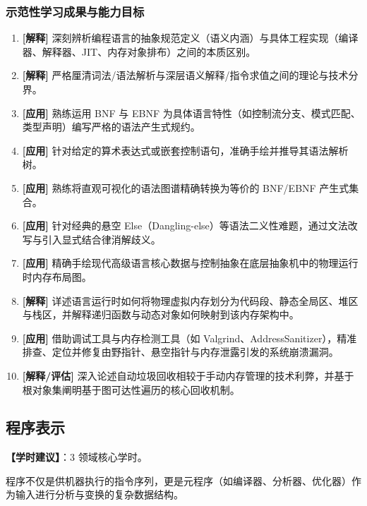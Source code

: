 \subsubsection{示范性学习成果与能力目标}
\begin{enumerate}
    \item \textbf{[解释]} 深刻辨析编程语言的抽象规范定义（语义内涵）与具体工程实现（编译器、解释器、JIT、内存对象排布）之间的本质区别。
    \item \textbf{[解释]} 严格厘清词法/语法解析与深层语义解释/指令求值之间的理论与技术分界。
    \item \textbf{[应用]} 熟练运用 BNF 与 EBNF 为具体语言特性（如控制流分支、模式匹配、类型声明）编写严格的语法产生式规约。
    \item \textbf{[应用]} 针对给定的算术表达式或嵌套控制语句，准确手绘并推导其语法解析树。
    \item \textbf{[应用]} 熟练将直观可视化的语法图谱精确转换为等价的 BNF/EBNF 产生式集合。
    \item \textbf{[应用]} 针对经典的悬空 Else（Dangling-else）等语法二义性难题，通过文法改写与引入显式结合律消解歧义。
    \item \textbf{[应用]} 精确手绘现代高级语言核心数据与控制抽象在底层抽象机中的物理运行时内存布局图。
    \item \textbf{[解释]} 详述语言运行时如何将物理虚拟内存划分为代码段、静态全局区、堆区与栈区，并解释递归函数与动态对象如何映射到该内存架构中。
    \item \textbf{[应用]} 借助调试工具与内存检测工具（如 Valgrind、AddressSanitizer），精准排查、定位并修复由野指针、悬空指针与内存泄露引发的系统崩溃漏洞。
    \item \textbf{[解释/评估]} 深入论述自动垃圾回收相较于手动内存管理的技术利弊，并基于根对象集阐明基于图可达性遍历的核心回收机制。
\end{enumerate}

\subsection{程序表示}
\textbf{【学时建议】}：3 领域核心学时。

程序不仅是供机器执行的指令序列，更是元程序（如编译器、分析器、优化器）作为输入进行分析与变换的复杂数据结构。

